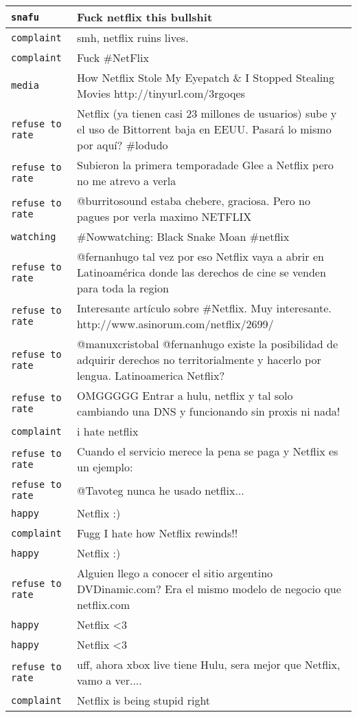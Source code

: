 {\begin{longtable}{|l|p{160mm}|}
         \texttt{snafu} & Fuck netflix this bullshit
      \tabularnewline\hline
         \texttt{complaint} & smh, netflix ruins lives.
      \tabularnewline\hline
         \texttt{complaint} & Fuck \#NetFlix
      \tabularnewline\hline
         \texttt{media} & How Netflix Stole My Eyepatch \& I Stopped Stealing Movies http://tinyurl.com/3rgoqes
      \tabularnewline\hline
         \texttt{refuse to rate} & Netflix (ya tienen casi 23 millones de usuarios) sube y el uso de Bittorrent baja en EEUU. Pasará lo mismo por aquí? \#lodudo
      \tabularnewline\hline
         \texttt{refuse to rate} & Subieron la primera temporadade Glee a Netflix pero no me atrevo a verla
      \tabularnewline\hline
         \texttt{refuse to rate} & @burritosound estaba chebere, graciosa. Pero no pagues por verla maximo NETFLIX
      \tabularnewline\hline
         \texttt{watching} & \#Nowwatching: Black Snake Moan \#netflix
      \tabularnewline\hline
         \texttt{refuse to rate} & @fernanhugo tal vez por eso Netflix vaya a abrir en Latinoamérica donde las derechos de cine se venden para toda la region
      \tabularnewline\hline
         \texttt{refuse to rate} & Interesante artículo sobre \#Netflix. Muy interesante. http://www.asinorum.com/netflix/2699/
      \tabularnewline\hline
         \texttt{refuse to rate} & @manuxcristobal @fernanhugo existe la posibilidad de adquirir derechos no territorialmente y hacerlo por lengua. Latinoamerica Netflix?
      \tabularnewline\hline
         \texttt{refuse to rate} & OMGGGGG Entrar a hulu, netflix y tal solo cambiando una DNS y funcionando sin proxis ni nada!
      \tabularnewline\hline
         \texttt{complaint} & i hate netflix
      \tabularnewline\hline
         \texttt{refuse to rate} & Cuando el servicio merece la pena se paga y Netflix es un ejemplo:
      \tabularnewline\hline
         \texttt{refuse to rate} & @Tavoteg nunca he usado netflix...
      \tabularnewline\hline
         \texttt{happy} & Netflix :)
      \tabularnewline\hline
         \texttt{complaint} & Fugg I hate how Netflix rewinds!!
      \tabularnewline\hline
         \texttt{happy} & Netflix :)
      \tabularnewline\hline
         \texttt{refuse to rate} & Alguien llego a conocer el sitio argentino DVDinamic.com? Era el mismo modelo de negocio que netflix.com
      \tabularnewline\hline
         \texttt{happy} & Netflix <3
      \tabularnewline\hline
         \texttt{happy} & Netflix <3
      \tabularnewline\hline
         \texttt{refuse to rate} & uff, ahora xbox live tiene Hulu, sera mejor que Netflix, vamo a ver....
      \tabularnewline\hline
         \texttt{complaint} & Netflix is being stupid right

\end{longtable}}

